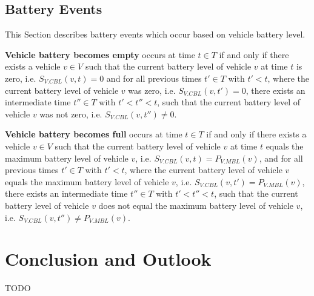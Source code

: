 \documentclass[graybox]{svmult}
\begin{document}
\noindent
\subsection{Battery Events}
\label{sec:battery-events}
This Section describes battery events which occur based on vehicle battery level.
\vspace{4mm}

\noindent
\textbf{Vehicle battery becomes empty}
occurs at time $t \in T$ if and only if there exists a vehicle $v \in V$ such that the current battery level of vehicle $v$ at time $t$ is zero, i.e. $S_{V.CBL}(v,t) = 0$ and for all previous times $t' \in T$ with $t' < t$, where the current battery level of vehicle $v$ was zero, i.e. $S_{V.CBL}(v,t') = 0$, there exists an intermediate time $t'' \in T$ with $t' < t'' < t$, such that the current battery level of vehicle $v$ was not zero, i.e. $S_{V.CBL}(v,t'') \neq 0$.

\vspace{4mm}
\noindent
\textbf{Vehicle battery becomes full}
occurs at time $t \in T$ if and only if there exists a vehicle $v \in V$ such that the current battery level of vehicle $v$ at time $t$ equals the maximum battery level of vehicle $v$, i.e. $S_{V.CBL}(v,t) = P_{V.MBL}(v)$, and for all previous times $t' \in T$ with $t' < t$, where the current battery level of vehicle $v$ equals the maximum battery level of vehicle $v$, i.e. $S_{V.CBL}(v,t') = P_{V.MBL}(v)$, there exists an intermediate time $t'' \in T$ with $t' < t'' < t$, such that the current battery level of vehicle $v$ does not equal the maximum battery level of vehicle $v$, i.e. $S_{V.CBL}(v,t'') \neq P_{V.MBL}(v)$.

\vspace{-2mm}

\section{Conclusion and Outlook}
\label{sec:con}
TODO
\vspace{-2mm}



\end{document}
